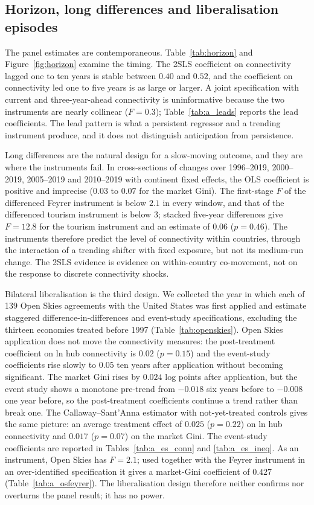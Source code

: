 \documentclass[12pt]{article}
\begin{document}
\subsection{Horizon, long differences and liberalisation episodes}
\label{sec:horizon}
The panel estimates are contemporaneous. Table~\ref{tab:horizon} and Figure~\ref{fig:horizon} examine the timing. The 2SLS coefficient on connectivity lagged one to ten years is stable between $0.40$ and $0.52$, and the coefficient on connectivity led one to five years is as large or larger. A joint specification with current and three-year-ahead connectivity is uninformative because the two instruments are nearly collinear ($F=0.3$); Table~\ref{tab:a_leads} reports the lead coefficients. The lead pattern is what a persistent regressor and a trending instrument produce, and it does not distinguish anticipation from persistence.

Long differences are the natural design for a slow-moving outcome, and they are where the instruments fail. In cross-sections of changes over 1996--2019, 2000--2019, 2005--2019 and 2010--2019 with continent fixed effects, the OLS coefficient is positive and imprecise ($0.03$ to $0.07$ for the market Gini). The first-stage $F$ of the differenced Feyrer instrument is below $2.1$ in every window, and that of the differenced tourism instrument is below $3$; stacked five-year differences give $F=12.8$ for the tourism instrument and an estimate of $0.06$ ($p=0.46$). The instruments therefore predict the level of connectivity within countries, through the interaction of a trending shifter with fixed exposure, but not its medium-run change. The 2SLS evidence is evidence on within-country co-movement, not on the response to discrete connectivity shocks.

Bilateral liberalisation is the third design. We collected the year in which each of 139 Open Skies agreements with the United States was first applied and estimate staggered difference-in-differences and event-study specifications, excluding the thirteen economies treated before 1997 (Table~\ref{tab:openskies}). Open Skies application does not move the connectivity measures: the post-treatment coefficient on ln hub connectivity is $0.02$ ($p=0.15$) and the event-study coefficients rise slowly to $0.05$ ten years after application without becoming significant. The market Gini rises by $0.024$ log points after application, but the event study shows a monotone pre-trend from $-0.018$ six years before to $-0.008$ one year before, so the post-treatment coefficients continue a trend rather than break one. The Callaway--Sant'Anna estimator with not-yet-treated controls gives the same picture: an average treatment effect of $0.025$ ($p=0.22$) on ln hub connectivity and $0.017$ ($p=0.07$) on the market Gini. The event-study coefficients are reported in Tables~\ref{tab:a_es_conn} and \ref{tab:a_es_ineq}. As an instrument, Open Skies has $F=2.1$; used together with the Feyrer instrument in an over-identified specification it gives a market-Gini coefficient of $0.427$ (Table~\ref{tab:a_osfeyrer}). The liberalisation design therefore neither confirms nor overturns the panel result; it has no power.
\end{document}
